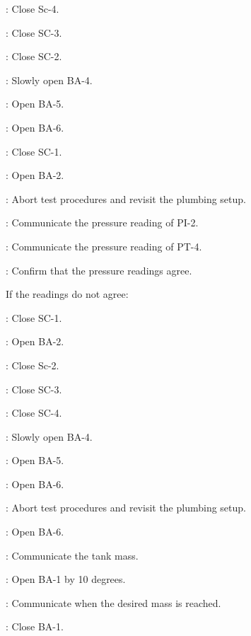 \begin{checklist}
    \begin{checklist}
            \item \primary{}: Close Sc-4.
            \item \primary{}: Close SC-3.
            \item \primary{}: Close SC-2. 
            \item \primary{}: Slowly open BA-4.
            \item \primary{}: Open BA-5. 
            \item \primary{}: Open BA-6. 
            \item \primary{}: Close SC-1.
            \item \primary{}: Open BA-2.
            \item \ops{}: Abort test procedures and revisit the plumbing setup. 
    \end{checklist}
    \item \primary{}: Communicate the pressure reading of PI-2. 
    \item \daq{}: Communicate the pressure reading of PT-4.
    \item \ops{}: Confirm that the pressure readings agree. 
    \item If the readings do not agree:
    \begin{checklist}
            \item \primary{}: Close SC-1.
            \item \primary{}: Open BA-2.
            \item \primary{}: Close Sc-2.
            \item \primary{}: Close SC-3.
            \item \primary{}: Close SC-4. 
            \item \primary{}: Slowly open BA-4.
            \item \primary{}: Open BA-5. 
            \item \primary{}: Open BA-6. 
            \item \ops{}: Abort test procedures and revisit the plumbing setup. 
    \end{checklist}
    \item \primary{}: Open BA-6.
    \item \daq{}: Communicate the tank mass.
    \item \primary{}: Open BA-1 by 10 degrees.
    \item \daq{}: Communicate when the desired mass is reached. 
    \item \primary{}: Close BA-1. 

\end{checklist}
